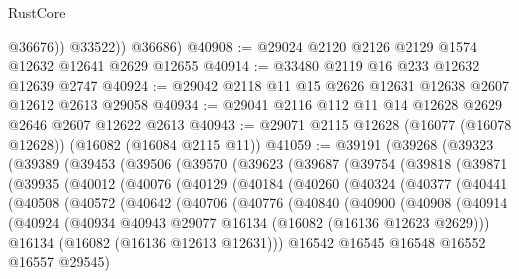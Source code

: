 \begin{lexlean}{RustCore}
\begin{coremodule}
              @36676))
          @33522))
      @36686)
@40908 := @29024 @2120 @2126 @2129 @1574 @12632 @12641 @2629 @12655
@40914 := @33480 @2119 @16 @233 @12632 @12639 @2747
@40924 := @29042 @2118 @11 @15 @2626 @12631 @12638 @2607 @12612 @2613 @29058
@40934 := @29041 @2116 @112 @11 @14 @12628 @2629 @2646 @2607 @12622 @2613
@40943 := @29071 @2115 @12628 (@16077 (@16078 @12628)) (@16082 (@16084 @2115 @11))
@41059 := @39191
    (@39268
      (@39323
        (@39389
          (@39453
            (@39506
              (@39570
                (@39623
                  (@39687
                    (@39754
                      (@39818
                        (@39871
                          (@39935
                            (@40012
                              (@40076
                                (@40129
                                  (@40184
                                    (@40260
                                      (@40324
                                        (@40377
                                          (@40441
                                            (@40508
                                              (@40572
                                                (@40642
                                                  (@40706
                                                    (@40776
                                                      (@40840
                                                        (@40900
                                                          (@40908
                                                            (@40914
                                                              (@40924
                                                                (@40934
                                                                  @40943
                                                                  @29077
                                                                  @16134
                                                                  (@16082 (@16136 @12623 @2629)))
                                                                @16134
                                                                (@16082 (@16136 @12613 @12631)))
                                                              @16542
                                                              @16545
                                                              @16548
                                                              @16552
                                                              @16557
                                                              @29545)

\end{coremodule}
\end{lexlean}

